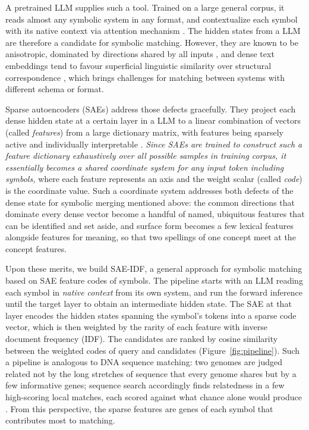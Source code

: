 \documentclass[11pt]{article}
\newcommand{\method}{SAE\mbox{-}IDF\xspace}
\begin{document}
A pretrained LLM supplies such a tool.
Trained on a large general corpus, it reads almost any symbolic system in any format, and contextualize each symbol with its native context via attention mechanism \citep{attention}. 
The hidden states from a LLM are therefore a candidate for symbolic matching. However, they are known to be anisotropic, dominated by directions shared by all inputs \citep{ethayarajh2019contextual, mu2018allbutthetop}, and dense text embeddings tend to favour superficial linguistic similarity over structural correspondence \citep{yang2024analogy}, which brings challenges for matching between systems with different schema or format. 

Sparse autoencoders (SAEs) address those defects gracefully. They project each dense hidden state at a certain layer in a LLM to a linear combination of vectors (called \textit{features}) from a large dictionary matrix, with features being sparsely active and individually interpretable \citep{bricken2023monosemanticity, cunningham2024sparse, templeton2024scaling}. \textit{Since SAEs are trained to construct such a feature dictionary exhaustively over all possible samples in training corpus, it essentially becomes a shared coordinate system for any input token including symbols, } where each feature represents an axis and the weight scalar (called \textit{code}) is the coordinate value. 
Such a coordinate system addresses both defects of the dense state for symbolic merging mentioned above: the common directions that dominate every dense vector become a handful of named, ubiquitous features that can be identified and set aside, and surface form becomes a few lexical features alongside features for meaning, so that two spellings of one concept meet at the concept features.


Upon these merits, we build \method, a general approach for symbolic matching based on SAE feature codes of symbols. The pipeline starts with an LLM reading each symbol in \emph{native context} from its own system, and run the forward inference until the target layer to obtain an intermediate hidden state. The SAE at that layer encodes the hidden states spanning the symbol's tokens into a sparse code vector, which is then weighted by the rarity of each feature with inverse document frequency (IDF). The candidates are ranked by cosine similarity between the weighted codes of query and candidates (Figure~\ref{fig:pipeline}). Such a pipeline is analogous to DNA sequence matching: 
two genomes are judged related not by the long stretches of sequence that every genome shares but by a few informative genes; sequence search accordingly finds relatedness in a few high-scoring local matches, each scored against what chance alone would produce \citep{altschul1990blast}. From this perspective, the sparse features are genes of each symbol that contributes most to matching. 
\end{document}

